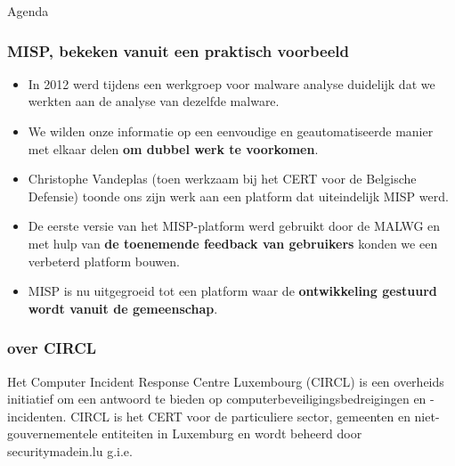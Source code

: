 
\begin{frame}[t,plain]
\titlepage
\end{frame}

\begin{frame}{Agenda}
    
\end{frame}

\begin{frame}
 \frametitle{MISP, bekeken vanuit een praktisch voorbeeld}
 \begin{itemize}
         \item In 2012 werd tijdens een werkgroep voor malware analyse duidelijk dat we werkten aan de analyse van dezelfde malware.
         \item We wilden onze informatie op een eenvoudige en geautomatiseerde manier met elkaar delen {\bf om dubbel werk te voorkomen}.
         \item Christophe Vandeplas (toen werkzaam bij het CERT voor de Belgische Defensie) toonde ons zijn werk aan een platform dat uiteindelijk MISP werd.
         \item De eerste versie van het MISP-platform werd gebruikt door de MALWG en met hulp van {\bf de toenemende feedback van gebruikers} konden we een verbeterd platform bouwen.
         \item MISP is nu uitgegroeid tot een platform waar de {\bf ontwikkeling gestuurd wordt vanuit de gemeenschap}.
 \end{itemize}
\end{frame}

\begin{frame}
\frametitle{over CIRCL}
Het Computer Incident Response Centre Luxembourg (CIRCL) is een overheids initiatief om een antwoord te bieden op computerbeveiligingsbedreigingen en -incidenten. \break \newline
CIRCL is het CERT voor de particuliere sector, gemeenten en niet-gouvernementele entiteiten in Luxemburg en wordt beheerd door securitymadein.lu g.i.e.
\end{frame}

